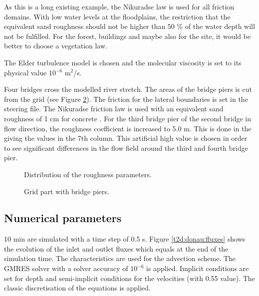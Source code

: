 As this is a long existing example, the Nikuradse law is used for all friction
domains. 
With low water levels at the floodplains, the restriction that the equivalent
sand roughness should not be higher than 50 \% of the water depth will not be
fulfilled.
For the forest, buildings and maybe also for the site, it would be better to
choose a vegetation law.  

The Elder turbulence model is chosen and the molecular viscosity is set to its
physical value 10$^{-6}$ m$^2$/s. 

Four bridges cross the modelled river stretch.
The areas of the bridge piers is cut from the grid (see Figure
\ref{t2d:donau:gridpiers}).
The friction for the lateral boundaries is set in the steering file.
The Nikuradse friction law is used 
with an equivalent sand roughness of 1 cm for concrete
.
For the third bridge pier of the second bridge in flow direction, the roughness
coefficient is increased to 5.0 m.
This is done in the  giving the values in the
7th column.
This artificial high value is chosen in order to see significant differences
in the flow field around the third and fourth bridge pier.

\begin{figure} [h!]
\centering
{}
\caption{Distribution of the roughness parameters.}
\label{t2d:donau:friction}
\end{figure}

\begin{figure} [h!]
\centering
{}
\caption{Grid part with bridge piers.}
\label{t2d:donau:gridpiers}
\end{figure}

\subsection{Numerical parameters}
10 min are simulated with a time step of 0.5 s.
Figure \ref{t2d:donau:fluxes} shows the evolution of the inlet and outlet fluxes
which equals at the end of the simulation time.
The characteristics are used for the advection scheme.
The GMRES solver with a solver accuracy of $10^{-6}$ is applied.
Implicit conditions are set for depth
and semi-implicit conditions for the velocities (with 0.55 value).
The classic discretisation of the equations is applied.

